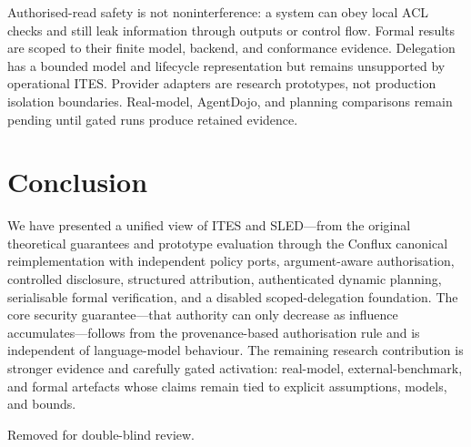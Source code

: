 \documentclass{article}
\begin{document}
Authorised-read safety is not noninterference: a system can obey local ACL
checks and still leak information through outputs or control flow. Formal
results are scoped to their finite model, backend, and conformance
evidence. Delegation has a bounded model and lifecycle representation but
remains unsupported by operational ITES. Provider adapters are research
prototypes, not production isolation boundaries. Real-model, AgentDojo, and
planning comparisons remain pending until gated runs produce retained
evidence.


\section{Conclusion}

We have presented a unified view of ITES and SLED---from the original
theoretical guarantees and prototype evaluation through the Conflux
canonical reimplementation with independent policy ports, argument-aware
authorisation, controlled disclosure, structured attribution, authenticated
dynamic planning, serialisable formal verification, and a disabled
scoped-delegation foundation. The core security guarantee---that authority
can only decrease as influence accumulates---follows from the
provenance-based authorisation rule and is independent of language-model
behaviour. The remaining research contribution is stronger evidence and
carefully gated activation: real-model, external-benchmark, and formal
artefacts whose claims remain tied to explicit assumptions, models, and
bounds.


\begin{ack}
Removed for double-blind review.
\end{ack}






\appendix

\end{document}
